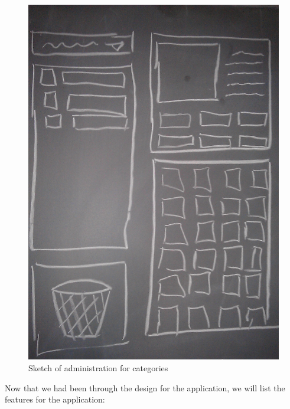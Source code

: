 \begin{figure}[htbp]
	\centering
		\includegraphics[scale=0.12]{input/images/admincate.jpg}
	\caption{Sketch of administration for categories}
	\label{fig:admincate}
\end{figure}

Now that we had been through the design for the application, we will list the features for the application: 

